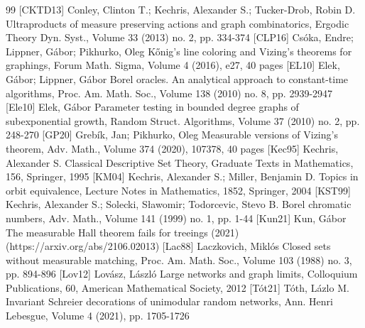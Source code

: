 \begin{thebibliography}{99}
 [CKTD13] Conley, Clinton T.; Kechris, Alexander S.; Tucker-Drob, Robin D. Ultraproducts of measure preserving actions and graph combinatorics, Ergodic Theory Dyn. Syst., Volume 33 (2013) no. 2, pp. 334-374
 [CLP16] Csóka, Endre; Lippner, Gábor; Pikhurko, Oleg Kőnig’s line coloring and Vizing’s theorems for graphings, Forum Math. Sigma, Volume 4 (2016), e27, 40 pages
 [EL10] Elek, Gábor; Lippner, Gábor Borel oracles. An analytical approach to constant-time algorithms, Proc. Am. Math. Soc., Volume 138 (2010) no. 8, pp. 2939-2947
 [Ele10] Elek, Gábor Parameter testing in bounded degree graphs of subexponential growth, Random Struct. Algorithms, Volume 37 (2010) no. 2, pp. 248-270
 [GP20] Grebík, Jan; Pikhurko, Oleg Measurable versions of Vizing’s theorem, Adv. Math., Volume 374 (2020), 107378, 40 pages
 [Kec95] Kechris, Alexander S. Classical Descriptive Set Theory, Graduate Texts in Mathematics, 156, Springer, 1995
 [KM04] Kechris, Alexander S.; Miller, Benjamin D. Topics in orbit equivalence, Lecture Notes in Mathematics, 1852, Springer, 2004
 [KST99] Kechris, Alexander S.; Solecki, Sławomir; Todorcevic, Stevo B. Borel chromatic numbers, Adv. Math., Volume 141 (1999) no. 1, pp. 1-44
 [Kun21] Kun, Gábor The measurable Hall theorem fails for treeings (2021) (https://arxiv.org/abs/2106.02013)
 [Lac88] Laczkovich, Miklós Closed sets without measurable matching, Proc. Am. Math. Soc., Volume 103 (1988) no. 3, pp. 894-896
 [Lov12] Lovász, László Large networks and graph limits, Colloquium Publications, 60, American Mathematical Society, 2012
 [Tót21] Tóth, Lázlo M. Invariant Schreier decorations of unimodular random networks, Ann. Henri Lebesgue, Volume 4 (2021), pp. 1705-1726
\end{thebibliography}
